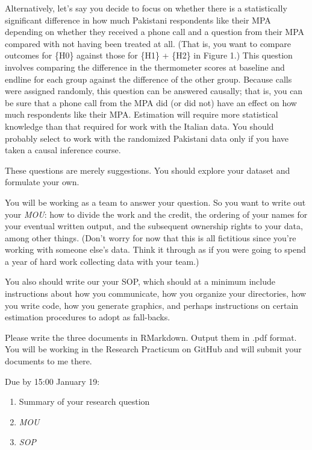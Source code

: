 \documentclass[11pt,a4paper]{article}
\begin{document}
Alternatively, let's say you decide to focus on whether there is a statistically significant difference in how much Pakistani respondents like their MPA  depending on whether they received a phone call and a question from their MPA compared with not having been treated at all.  (That is, you want to compare outcomes for \{H0\} against those for \{H1\} + \{H2\} in Figure 1.) This question involves comparing the difference in the thermometer scores at baseline and endline for each group against the difference of the other group. Because calls were assigned randomly, this question can be answered causally; that is, you can be sure that a phone call from the MPA did (or did not) have an effect on how much respondents like their MPA. Estimation will require more statistical knowledge than that required for work with the Italian data. You should probably select to work with the randomized Pakistani data only if you have taken a causal inference course. 

These questions are merely suggestions. You should explore your dataset and formulate your own. 

You will be working as a team to answer your question. So you want to write out your {\it MOU}: how to divide the work and the credit, the ordering of your names for your eventual written output, and the subsequent ownership rights to your data, among other things. (Don't worry for now that this is all fictitious since you're working with someone else's data. Think it through as if you were going to spend a year of hard work collecting data with your team.) 

You also should write our your SOP, which should at a minimum include instructions about how you communicate, how you organize your directories, how you write code, how you generate graphics, and perhaps instructions on certain estimation procedures to adopt as fall-backs. 

Please write the three documents in RMarkdown. Output them in .pdf format. You will be working in the Research Practicum on GitHub and will submit your documents to me there. 

Due by 15:00 January 19: 

\begin{enumerate}[noitemsep]
\item Summary of your research question
\item {\it MOU} 
\item {\it SOP} 
\end{enumerate}
\end{document}
